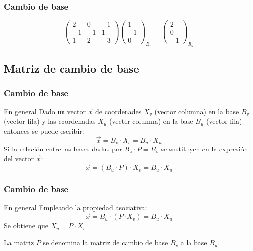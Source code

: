 \documentclass{beamer}
\begin{document}
 \begin{frame}
  \frametitle{Cambio de base}

\[ \left(\begin{array}{ccc}2 & 0 & -1 \\-1 & -1 & 1 \\1 & 2 & -3\end{array}\right) \left(\begin{array}{c}1\\-1\\0\end{array}\right)_{B_v}  = \left(\begin{array}{c}2\\0\\-1\end{array}\right)_{B_u} \]
\end{frame}





\subsection{Matriz de cambio de base}

 \begin{frame}
  \frametitle{Cambio de base}
\begin{block}{En general}
Dado un vector $\vec x$ de coordenades $X_v$ (vector columna) en la base $B_v$ (vector fila) y las coordenadas $X_u$ (vector columna) en la base $B_u$ (vector fila) entonces se puede escribir:
\[\vec x = B_v\cdot X_v = B_u\cdot X_u\]
Si la relaci\'on entre las bases dadas por $B_u\cdot P = B_v$ se sustituyen en la expresi\'on del vector $\vec x$:
\[\vec x = (B_u\cdot P) \cdot X_v = B_u \cdot X_u \]
\end{block}
\end{frame}

 \begin{frame}
  \frametitle{Cambio de base}
\begin{block}{En general}
Empleando la propiedad asociativa:
\[\vec x = B_u\cdot( P \cdot X_v) = B_u \cdot X_u \]
Se obtiene que $X_u = P\cdot X_v$
\end{block}
La matriz $P$ se denomina la matriz de cambio de base $B_v$ a la base $B_u$.
\end{frame}
\end{document}
